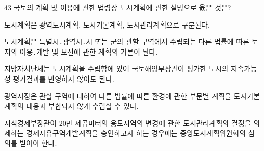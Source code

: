 \begin{question}{43}
국토의 계획 및 이용에 관한 법령상 도시계획에 관한 설명으로 옳은 것은?
\begin{choices}
  \item 도시계획은 광역도시계획, 도시기본계획, 도시관리계획으로 구분된다.
  \item 도시계획은 특별시․광역시․시 또는 군의 관할 구역에서 수립되는 다른 법률에 따른 토지의 이용․개발 및 보전에 관한 계획의 기본이 된다.
  \item 지방자치단체는 도시계획을 수립함에 있어 국토해양부장관이 평가한 도시의 지속가능성 평가결과를 반영하지 않아도 된다.
  \item 광역시장은 관할 구역에 대하여 다른 법률에 따른 환경에 관한 부문별 계획을 도시기본계획의 내용과 부합되지 않게 수립할 수 있다.
  \item 지식경제부장관이 20만 제곱미터의 용도지역의 변경에 관한 도시관리계획의 결정을 의제하는 경제자유구역개발계획을 승인하고자 하는 경우에는 중앙도시계획위원회의 심의를 받아야 한다.
\end{choices}
\end{question}
